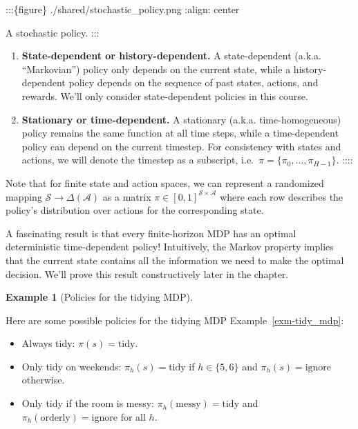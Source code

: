 \documentclass[
  letterpaper,
  DIV=11,
  numbers=noendperiod]{scrreprt}
\theoremstyle{plain}
\theoremstyle{plain}
\theoremstyle{definition}
\newtheorem{example}{Example}[chapter]
\theoremstyle{definition}
\theoremstyle{remark}
\begin{document}
:::\{figure\} ./shared/stochastic\_policy.png :align: center

A stochastic policy. :::

\begin{enumerate}
\def\labelenumi{\arabic{enumi}.}
\setcounter{enumi}{1}
\item
  \textbf{State-dependent or history-dependent.} A state-dependent
  (a.k.a. ``Markovian'') policy only depends on the current state, while
  a history-dependent policy depends on the sequence of past states,
  actions, and rewards. We'll only consider state-dependent policies in
  this course.
\item
  \textbf{Stationary or time-dependent.} A stationary (a.k.a.
  time-homogeneous) policy remains the same function at all time steps,
  while a time-dependent policy can depend on the current timestep. For
  consistency with states and actions, we will denote the timestep as a
  subscript, i.e.~\(\pi = \{ \pi_0, \dots, \pi_{H-1} \}.\) ::::
\end{enumerate}

Note that for finite state and action spaces, we can represent a
randomized mapping \(\mathcal{S} \to \Delta(\mathcal{A})\) as a matrix
\(\pi \in [0, 1]^{\mathcal{S} \times \mathcal{A}}\) where each row
describes the policy's distribution over actions for the corresponding
state.

A fascinating result is that every finite-horizon MDP has an optimal
deterministic time-dependent policy! Intuitively, the Markov property
implies that the current state contains all the information we need to
make the optimal decision. We'll prove this result constructively later
in the chapter.

\begin{example}[Policies for the tidying
MDP]\protect\hypertarget{exm-tidy_policy}{}\label{exm-tidy_policy}

Here are some possible policies for the tidying MDP
Example~\ref{exm-tidy_mdp}:

\begin{itemize}
\item
  Always tidy: \(\pi(s) = \text{tidy}\).
\item
  Only tidy on weekends: \(\pi_h(s) = \text{tidy}\) if
  \(h\in \{ 5, 6 \}\) and \(\pi_h(s) = \text{ignore}\) otherwise.
\item
  Only tidy if the room is messy: \(\pi_h(\text{messy}) = \text{tidy}\)
  and \(\pi_h(\text{orderly}) = \text{ignore}\) for all \(h\).
\end{itemize}

\end{example}
\end{document}
